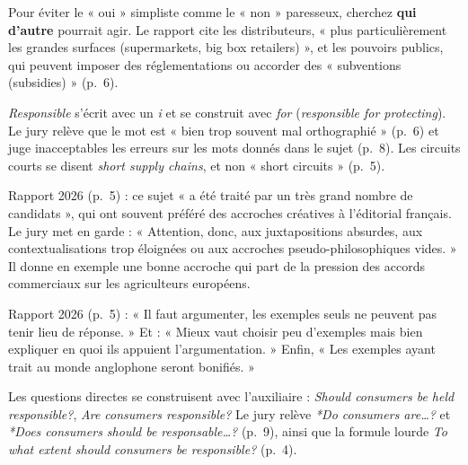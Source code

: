 \documentclass[11pt,a4paper]{article}
\begin{document}
\begin{methode}

Pour éviter le « oui » simpliste comme le « non » paresseux, cherchez \textbf{qui d'autre} pourrait agir. Le rapport cite les distributeurs, « plus particulièrement les grandes surfaces (supermarkets, big box retailers) », et les pouvoirs publics, qui peuvent imposer des réglementations ou accorder des « subventions (subsidies) » (p.~6).

\end{methode}

\begin{piege}

\emph{Responsible} s'écrit avec un \emph{i} et se construit avec \emph{for} (\emph{responsible for protecting}). Le jury relève que le mot est « bien trop souvent mal orthographié » (p.~6) et juge inacceptables les erreurs sur les mots donnés dans le sujet (p.~8). Les circuits courts se disent \emph{short supply chains}, et non « short circuits » (p.~5).

\end{piege}

\begin{jury}

Rapport 2026 (p.~5) : ce sujet « a été traité par un très grand nombre de candidats », qui ont souvent préféré des accroches créatives à l'éditorial français. Le jury met en garde : « Attention, donc, aux juxtapositions absurdes, aux contextualisations trop éloignées ou aux accroches pseudo-philosophiques vides. » Il donne en exemple une bonne accroche qui part de la pression des accords commerciaux sur les agriculteurs européens.

\end{jury}

\begin{jury}

Rapport 2026 (p.~5) : « Il faut argumenter, les exemples seuls ne peuvent pas tenir lieu de réponse. » Et : « Mieux vaut choisir peu d'exemples mais bien expliquer en quoi ils appuient l'argumentation. » Enfin, « Les exemples ayant trait au monde anglophone seront bonifiés. »

\end{jury}

\begin{piege}

Les questions directes se construisent avec l'auxiliaire : \emph{Should consumers be held responsible?}, \emph{Are consumers responsible?} Le jury relève \emph{*Do consumers are\ldots?} et \emph{*Does consumers should be responsable\ldots?} (p.~9), ainsi que la formule lourde \emph{To what extent should consumers be responsible?} (p.~4).

\end{piege}
\end{document}
